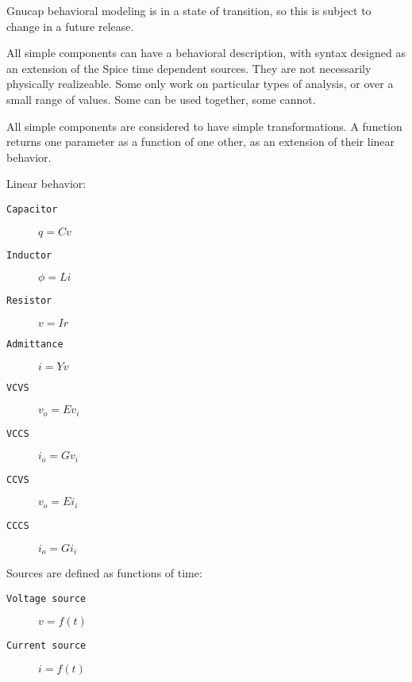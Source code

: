 %
%
%
%
Gnucap behavioral modeling is in a state of transition, so this is
subject to change in a future release.

All simple components can have a behavioral description,
with syntax designed as an extension of the Spice time dependent
sources.  They are not necessarily physically realizeable.  Some only
work on particular types of analysis, or over a small range of
values.  Some can be used together, some cannot.

All simple components are considered to have simple
transformations.  A function returns one parameter as a function of
one other, as an extension of their linear behavior.

Linear behavior:

\begin{description}
\item[{\tt Capacitor}] $q = C v$
\item[{\tt Inductor}] $\phi = L i$
\item[{\tt Resistor}] $v = I r$
\item[{\tt Admittance}] $i = Y v$
\item[{\tt VCVS}] $v_o = E v_i$
\item[{\tt VCCS}] $i_o = G v_i$
\item[{\tt CCVS}] $v_o = E i_i$
\item[{\tt CCCS}] $i_o = G i_i$
\end{description}

Sources are defined as functions of time:

\begin{description}
\item[{\tt Voltage source}] $v = f(t)$
\item[{\tt Current source}] $i = f(t)$
\end{description}

